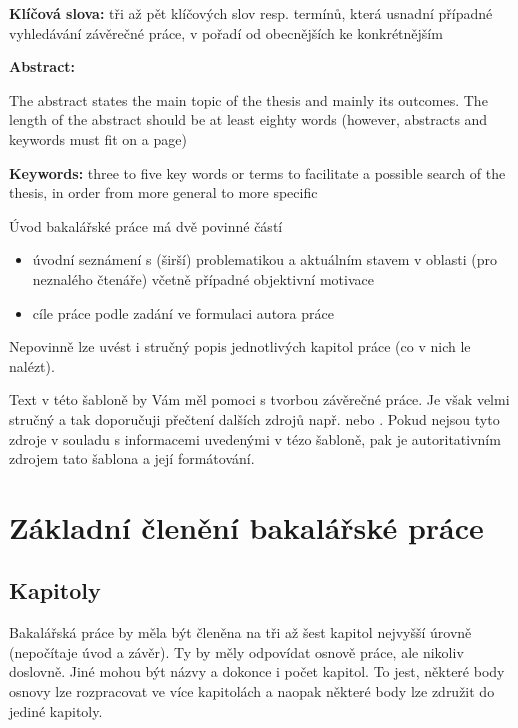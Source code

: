 \documentclass[male,czech]{kitheses}
\newcommand{\ZT}[1]{\colorbox{yellow}{\color{red}{#1}}}
\newcommand{\nazeven}{\ZT{Thesis on KI PřF}}     %
\begin{document}
\textbf{Klíčová slova:} tři až pět klíčových slov resp. termínů, která usnadní případné vyhledávání závěrečné práce, v pořadí od obecnějších ke konkrétnějším

\bigskip


\textsc{\nazeven}

\textbf{Abstract:}

The abstract states the main topic of the thesis and mainly its outcomes. The length of the abstract should be at least eighty words (however, abstracts and keywords must fit on a page)

\textbf{Keywords:} three to five key words or terms to facilitate a possible search of the thesis, in order from more general to more specific

\tableofcontents


Úvod bakalářské práce má dvě povinné částí

\begin{itemize}
\item úvodní seznámení s (širší) problematikou a aktuálním stavem v oblasti (pro neznalého čtenáře) včetně případné objektivní motivace 
\item cíle práce podle zadání ve formulaci autora práce
\end{itemize}

Nepovinně lze uvést i stručný popis jednotlivých kapitol práce (co v nich le nalézt).

Text v této šabloně by Vám měl pomoci s tvorbou závěrečné práce. Je však velmi stručný a tak doporučuji přečtení dalších zdrojů např. \cite{Katuscakc2008} nebo 
\cite{Ticha2009}. Pokud nejsou tyto zdroje v souladu s informacemi uvedenými v tézo šabloně, pak je autoritativním zdrojem tato šablona a její formátování.

\chapter{Základní členění bakalářské práce}

\section{Kapitoly}

Bakalářská práce by měla být členěna na tři až  šest kapitol nejvyšší úrovně (nepočítaje úvod a závěr). Ty by měly odpovídat osnově práce, ale nikoliv doslovně. Jiné mohou být názvy a dokonce i počet kapitol. To jest, některé body osnovy lze rozpracovat ve více kapitolách a naopak některé body lze združit do jediné kapitoly.
\end{document}
